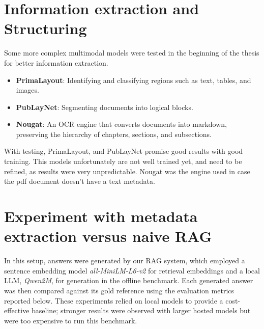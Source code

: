 \label{chapter:Results}

\section{Information extraction and Structuring}
Some more complex multimodal models were tested in the beginning of the thesis for better information extraction.
\begin{itemize}
    \item \textbf{PrimaLayout}: Identifying and classifying regions such as text, tables, and images.
    \item \textbf{PubLayNet}: Segmenting documents into logical blocks.
    \item \textbf{Nougat}: An OCR engine that converts documents into markdown, preserving the hierarchy of chapters, sections, and subsections.
\end{itemize}
With testing, PrimaLayout, and PubLayNet promise good results with good training. This models unfortunately are not well trained yet, and need to be refined, as results were very unpredictable. Nougat was the engine used in case the pdf document doesn't have a text metadata.

\section{Experiment with metadata extraction versus naive RAG}
In this setup, answers were generated by our RAG system, which employed a sentence embedding model \textit{all-MiniLM-L6-v2} for retrieval embeddings and a local \gls{LLM}, \textit{Qwen2M}, for generation in the offline benchmark. 
Each generated answer was then compared against its gold reference using the evaluation metrics reported below. 
These experiments relied on local models to provide a cost-effective baseline; stronger results were observed with larger hosted models but were too expensive to run this benchmark.

